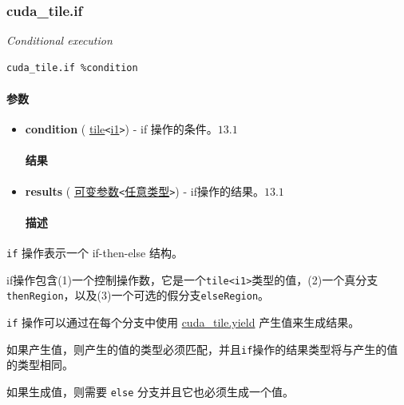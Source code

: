 \documentclass{article}
\begin{document}
\subsubsection{cuda\_tile.if}

\textit{Conditional execution}


\begin{lstlisting}
cuda_tile.if %condition
\end{lstlisting}

\paragraph{参数}

\begin{itemize}
\item \textbf{condition} ( \href{https://docs.nvidia.com/cuda/tile-ir/latest/sections/types.html#type-tile}{tile}\texttt{<}\href{https://docs.nvidia.com/cuda/tile-ir/latest/sections/types.html#subsection-element-types}{i1}\texttt{>}) - if 操作的条件。$\boxed{13.1}$


\paragraph{结果}

\item \textbf{results} ( \href{https://docs.nvidia.com/cuda/tile-ir/latest/sections/operations.html#type-variadic}{可变参数}\texttt{<}\href{https://docs.nvidia.com/cuda/tile-ir/latest/sections/operations.html#type-any}{任意类型}\texttt{>}) - if操作的结果。$\boxed{13.1}$


\paragraph{描述}

\end{itemize}
\texttt{if} 操作表示一个 if-then-else 结构。


if操作包含(1)一个控制操作数，它是一个\texttt{tile<i1>}类型的值，(2)一个真分支\texttt{thenRegion}，以及(3)一个可选的假分支\texttt{elseRegion}。


\texttt{if} 操作可以通过在每个分支中使用 \href{https://docs.nvidia.com/cuda/tile-ir/latest/sections/operations.html#op-cuda-tile-yield}{cuda\_tile.yield} 产生值来生成结果。


如果产生值，则产生的值的类型必须匹配，并且\texttt{if}操作的结果类型将与产生的值的类型相同。


如果生成值，则需要 \texttt{else} 分支并且它也必须生成一个值。
\end{document}
